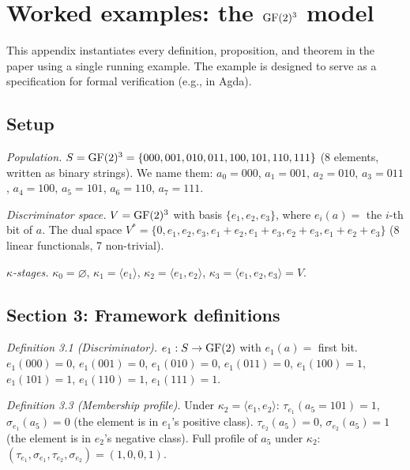 \section{Worked examples: the $\operatorname{GF}(2)^3$ model}
\label{app:examples}

This appendix instantiates every definition, proposition,
and theorem in the paper using a single running example.
The example is designed to serve as a specification for
formal verification (e.g., in Agda).

\subsection{Setup}

\emph{Population.} $S = \operatorname{GF}(2)^3 = \{000, 001, 010,
011, 100, 101, 110, 111\}$ (8 elements, written as
binary strings). We name them:
$a_0 = 000$, $a_1 = 001$, $a_2 = 010$, $a_3 = 011$,
$a_4 = 100$, $a_5 = 101$, $a_6 = 110$, $a_7 = 111$.

\emph{Discriminator space.} $V = \operatorname{GF}(2)^3$ with basis
$\{e_1, e_2, e_3\}$, where $e_i(a) =$ the $i$-th bit
of $a$. The dual space $V^* = \{0, e_1, e_2, e_3,
e_1{+}e_2, e_1{+}e_3, e_2{+}e_3, e_1{+}e_2{+}e_3\}$
(8 linear functionals, 7 non-trivial).

\emph{$\kappa$-stages.}
$\kappa_0 = \varnothing$,
$\kappa_1 = \langle e_1 \rangle$,
$\kappa_2 = \langle e_1, e_2 \rangle$,
$\kappa_3 = \langle e_1, e_2, e_3 \rangle = V$.

\subsection{Section 3: Framework definitions}

\emph{Definition 3.1 (Discriminator).}
$e_1: S \to \operatorname{GF}(2)$ with $e_1(a) =$ first bit.
$e_1(000) = 0$, $e_1(001) = 0$, $e_1(010) = 0$,
$e_1(011) = 0$, $e_1(100) = 1$, $e_1(101) = 1$,
$e_1(110) = 1$, $e_1(111) = 1$.

\emph{Definition 3.3 (Membership profile).}
Under $\kappa_2 = \langle e_1, e_2 \rangle$:
$\tau_{e_1}(a_5 = 101) = 1$, $\sigma_{e_1}(a_5) = 0$
(the element is in $e_1$'s positive class).
$\tau_{e_2}(a_5) = 0$, $\sigma_{e_2}(a_5) = 1$
(the element is in $e_2$'s negative class).
Full profile of $a_5$ under $\kappa_2$:
$(\tau_{e_1}, \sigma_{e_1}, \tau_{e_2}, \sigma_{e_2})
= (1, 0, 0, 1)$.

